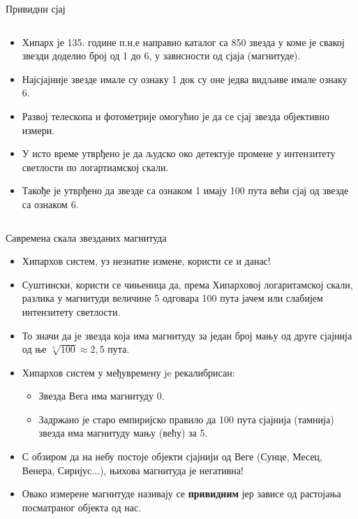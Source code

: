 \documentclass[aspectratio=169, xcolor=table, 10pt]{beamer}
\begin{document}
\begin{frame}{Привидни сјај}
\begin{columns}[T]
\begin{column}{0.65\textwidth}
\begin{itemize}
        \item Хипарх је 135. године п.н.е направио каталог са 850 звезда у коме је свакој звезди доделио број од 1 до 6, у зависности од сјаја (магнитуде).
        \item Најсјајније звезде имале су ознаку 1 док су оне једва видљиве имале ознаку 6.
        \item Развој телескопа и фотометрије омогућио је да се сјај звезда објективно измери.
        \item У исто време утврђено је да људско око детектује промене у интензитету светлости по логартиамској скали.
        \item Такође је утврђено да звезде са ознаком 1 имају 100 пута већи сјај од звезде са ознаком 6.
      \end{itemize}
    \end{column}
  \end{columns}
\end{frame}

\begin{frame}{Савремена скала звезданих магнитуда}
  \begin{itemize}
    \item Хипархов систем, уз незнатне измене, користи се и данас!
    \item Суштински, користи се чињеница да, према Хипарховој логаритамској скали, разлика у магнитуди величине 5 одговара 100 пута јачем или слабијем интензитету светлости.
    \item То значи да је звезда која има магнитуду за један број мању од друге сјајнија од ње $\sqrt[5]{100}\approx2,5$ пута.
    \item Хипархов систем у међувремену je рекалибрисан:
    \begin{itemize}
      \item Звезда Вега има магнитуду 0.
      \item Задржано је старо емпиријско правило да 100 пута сјајнија (тамнија) звезда има магнитуду мању (већу) за 5.
    \end{itemize}
  \item С обзиром да на небу постоје објекти сјајнији од Веге (Сунце, Месец, Венера, Сиријус...), њихова магнитуда је негативна!
  \item Овако измерене магнитуде називају се \textbf{привидним} јер зависе од растојања посматраног објекта од нас.
  \end{itemize}
\end{frame}
\end{document}
